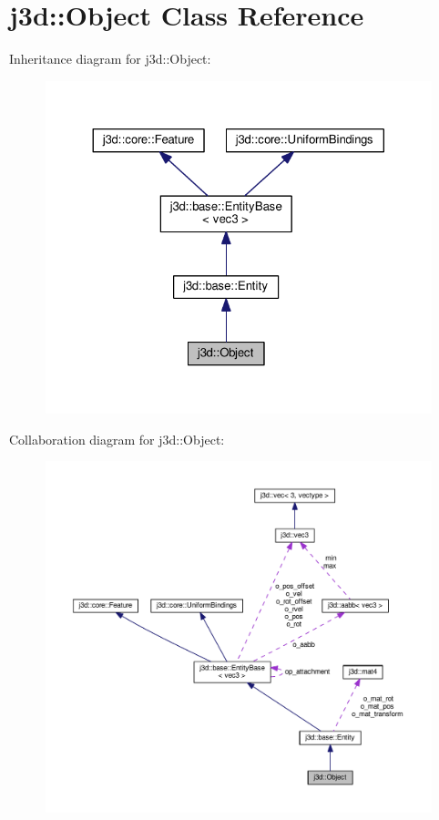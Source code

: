 \hypertarget{classj3d_1_1Object}{}\section{j3d\+:\+:Object Class Reference}
\label{classj3d_1_1Object}


Inheritance diagram for j3d\+:\+:Object\+:
\nopagebreak
\begin{figure}[H]
\begin{center}
\leavevmode
\includegraphics[width=324pt]{classj3d_1_1Object__inherit__graph}
\end{center}
\end{figure}


Collaboration diagram for j3d\+:\+:Object\+:
\nopagebreak
\begin{figure}[H]
\begin{center}
\leavevmode
\includegraphics[width=350pt]{classj3d_1_1Object__coll__graph}
\end{center}
\end{figure}
